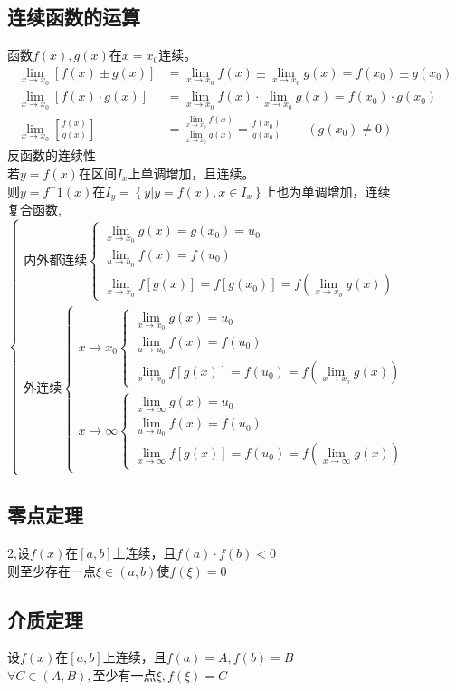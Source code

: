 \subsection{连续函数的运算}
函数$f(x),g(x)$在$x=x_0$连续。
\begin{displaymath}
    \begin{split}
        \lim\limits_{x\to x_0}\left[f(x)\pm g(x)\right]&=\lim\limits_{x\to x_0}f(x)\pm \lim\limits_{x\to x_0}g(x)=f(x_0)\pm g(x_0)\\
        \lim\limits_{x\to x_0}\left[f(x)\cdot g(x)\right]&=\lim\limits_{x\to x_0}f(x)\cdot \lim\limits_{x\to x_0}g(x)=f(x_0)\cdot g(x_0)\\
        \lim\limits_{x\to x_0}\left[\frac{f(x)}{g(x)}\right]&=\frac{\lim\limits_{x\to x_0}f(x)}{\lim\limits_{x\to x_0}g(x)}=\frac{f(x_0)}{g(x_0)}\qquad \left(g(x_0)\neq 0\right)
    \end{split}
\end{displaymath}
反函数的连续性\\
若$y=f(x)$在区间$I_x$上单调增加，且连续。\\
则$y=f^-1(x)$在$I_y=\left\{y|y=f(x),x\in I_x\right\}$上也为单调增加，连续\\
复合函数,$\begin{cases}
    \mbox{内外都连续}\begin{cases}
    \lim\limits_{x\to x_0}g(x)=g(x_0)=u_0\\
    \lim\limits_{u\to u_0}f(x)=f(u_0)\\
    \lim\limits_{x\to x_0}f\left[g(x)\right]=f\left[g(x_0)\right]=f(\lim\limits_{x\to x_o}g(x))
\end{cases}\\
    \mbox{外连续}\begin{cases}
        x\rightarrow x_0\begin{cases}
        \lim\limits_{x\to x_0}g(x)=u_0\\
        \lim\limits_{u\to u_0}f(x)=f(u_0)\\
        \lim\limits_{x\to x_0}f\left[g(x)\right]=f(u_0)=f(\lim\limits_{x\to x_o}g(x))
    \end{cases}\\
        x\rightarrow \infty\begin{cases}
            \lim\limits_{x\to \infty}g(x)=u_0\\
            \lim\limits_{u\to u_0}f(x)=f(u_0)\\
            \lim\limits_{x\to \infty}f\left[g(x)\right]=f(u_0)=f(\lim\limits_{x\to \infty}g(x))
        \end{cases}
    \end{cases}
\end{cases}$
\subsection{零点定理}
2,设$f(x)$在$\left[a,b\right]$上连续，且$f(a)\cdot f(b)<0$\\
则至少存在一点$\xi \in \left(a,b\right)$使$f(\xi)=0$
\subsection{介质定理}
设$f(x)$在$\left[a,b\right]$上连续，且$f(a)=A,f(b)=B$\\
$\forall C\in\left(A,B\right),$至少有一点$\xi,f(\xi)=C$

